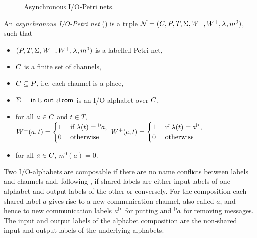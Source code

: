 \begin{figure}[htb]%
\centering
\subfloat[$\pnN_1$.]{\label{fig:ex-aiopn1} }\quad
\subfloat[$\pnN_2$.]{\label{fig:ex-aiopn2} }\quad
\subfloat[$\pnN_3$.]{\label{fig:ex-aiopn} }
\caption{Asynchronous I/O-Petri nets.}%
\label{fig:ex-aiopns}%
\end{figure}

\begin{definition}
An \emph{asynchronous I/O-Petri net} (\AIOPN) is a tuple $\mathcal{N} = (C_{},\allowbreak P_{},\allowbreak T_{},\allowbreak \Sigma_{},\allowbreak W_{}^-,\allowbreak W_{}^+,\allowbreak \lambda_{},\allowbreak m^0_{})$, such that 
\begin{itemize}
    \item $ (P_{}, \allowbreak T_{}, \allowbreak \Sigma_{}, \allowbreak W_{}^-, \allowbreak W_{}^+, \allowbreak \lambda_{}, \allowbreak m^0_{})$ is a labelled Petri net,  
    \item $C$ is a finite set of channels, 
    \item $C \subseteq P$, i.e. each channel is a place, 
    \item $\Sigma_{} = \mathsf{in}_{} \uplus \mathsf{out}_{} \uplus \mathsf{com}_{}$ is an I/O-alphabet over $C$, 
    \item for all $a \in C$ and $t \in T$,\\
            $W^-(a,t) = \begin{cases}
                    1 &\text{ if } \lambda(t) = \inact{a},\\
                    0 &\text{ otherwise }
                \end{cases}$\qquad
            $W^+(a,t) = \begin{cases}
                    1 &\text{ if } \lambda(t) = \outact{a},\\
                    0 & \text{ otherwise}
                \end{cases}$
    \item for all $a \in C$, $m^0(a) = 0$.
    \end{itemize}
\end{definition}


Two I/O-alphabets are composable if there are no name conflicts between labels and channels and, %
following \cite{alfaroHenzinger2005}, if
shared labels are either input labels of one alphabet and output labels of the other or conversely. For the composition each shared label $a$ gives rise to a new communication channel, also called $a$, and hence to new communication labels $\outact{a}$ for putting and $\inact{a}$ for removing messages. 
The input and output labels of the alphabet composition are the non-shared input and
output labels of the underlying alphabets.


